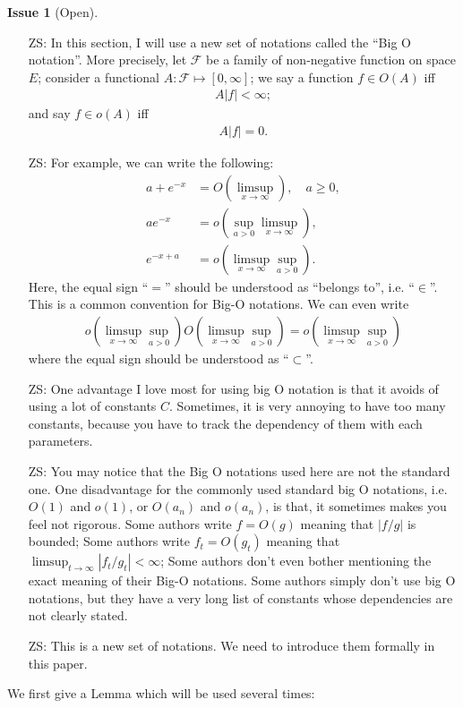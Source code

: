 \documentclass[12pt,a4paper]{amsart}
\numberwithin{equation}{section}
\theoremstyle{plain}
\theoremstyle{definition}
\newtheorem{iss}{Issue}
\begin{document}
\begin{iss}[Open]~
  \begin{itemize}
  \item[ZS:]
    In this section, I will use a new set of notations called the ``Big O notation''. More precisely, let $\mathcal F$ be a family of non-negative function on space $E$; consider a functional $A:\mathcal F \mapsto [0,\infty]$; we say a function $f \in O(A)$ iff
    \begin{align}
A |f| < \infty;
    \end{align}
and say $f \in o(A)$ iff
\begin{align}
A |f|  = 0.
\end{align}
\item[ZS:]
For example, we can write the following:
\begin{align}
a + e^{-x} &= O(\limsup_{x\to \infty}), \quad a\geq 0,
\\ a e^{-x} &= o(\sup_{a> 0} \limsup_{x\to \infty}),
\\ e^{-x+a} &= o(\limsup_{x\to \infty} \sup_{a>0}). 
\end{align}
Here, the equal sign ``$=$'' should be understood as ``belongs to'', i.e. ``$\in $''.
This is a common convention for Big-O notations. 
We can even write
\begin{align}
  o(\limsup_{x\to \infty} \sup_{a> 0}) O(\limsup_{x\to \infty} \sup_{a > 0}) = o(\limsup_{x\to \infty} \sup_{a>0})
  \end{align}
  where the equal sign should be understood as ``$\subset$''.
\item[ZS:]
  One advantage I love most for using big O notation is that it avoids of using a lot of constants $C$. 
Sometimes, it is very annoying to have too many constants, because you have to track the dependency of them with each parameters.
\item[ZS:]
  You may notice that the Big O notations used here are not the standard one.
  One disadvantage for the commonly used standard big O notations, i.e. $O(1)$ and $o(1)$, or $O(a_n)$ and $o(a_n)$, is that, it sometimes makes you feel not rigorous.
  Some authors write $f = O(g)$ meaning that $|f/g|$ is bounded;
  Some authors write $f_t = O(g_t)$ meaning that $\limsup_{t\to \infty}|f_t/g_t| < \infty$; 
  Some authors don't even bother mentioning the exact meaning of their Big-O notations.
  Some authors simply don't use big O notations, but they have a very long list of constants whose dependencies are not clearly stated.
\item[ZS:]
  This is a new set of notations. 
  We need to introduce them formally in this paper.
  \end{itemize}
\end{iss}
We first give a Lemma which will be used several times:
\end{document}
